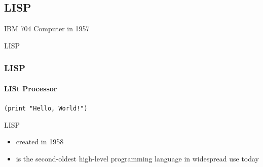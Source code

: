 \documentclass[aspectratio=169,usenames,dvipsnames]{beamer}
\begin{document}
    \subsection{LISP}
\begin{frame}[plain]
\hfill        {\small\color{white}IBM 704 Computer in 1957}
\vfill\vfill\vfill\vfill\vfill
\begin{minipage}[c]{0.5\textwidth}
        \pause
        \begin{center}
        \vspace*{2ex}
        \Huge LISP
        \vspace*{1ex}
        \end{center}
        \oldEndBlock
\end{minipage}\hfill


\end{frame}
    \begin{frame}
        \frametitle{LISP}
        \framesubtitle{LISt Processor}
            \begin{center}\texttt{(print "Hello, World!")}\end{center}
        \begin{block}{LISP}
            \begin{itemize}
                \item created in 1958
                \item is the second-oldest high-level programming language in widespread use today
            \end{itemize}
        \end{block}

    \end{frame}
\end{document}
